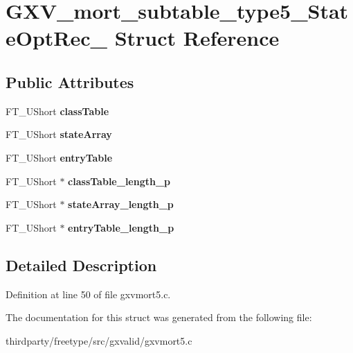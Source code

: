 \hypertarget{struct_g_x_v__mort__subtable__type5___state_opt_rec__}{}\section{G\+X\+V\+\_\+mort\+\_\+subtable\+\_\+type5\+\_\+\+State\+Opt\+Rec\+\_\+ Struct Reference}
\label{struct_g_x_v__mort__subtable__type5___state_opt_rec__}
\subsection*{Public Attributes}
\begin{DoxyCompactItemize}
\item 
\mbox{\label{struct_g_x_v__mort__subtable__type5___state_opt_rec___a9b5124ad7742d751b9063583eb8cda3d}} 
F\+T\+\_\+\+U\+Short {\bfseries class\+Table}
\item 
\mbox{\label{struct_g_x_v__mort__subtable__type5___state_opt_rec___a6799d05fa17deb25e779fc1c28029179}} 
F\+T\+\_\+\+U\+Short {\bfseries state\+Array}
\item 
\mbox{\label{struct_g_x_v__mort__subtable__type5___state_opt_rec___afee07205ffee1017850e002cdb7b1fdc}} 
F\+T\+\_\+\+U\+Short {\bfseries entry\+Table}
\item 
\mbox{\label{struct_g_x_v__mort__subtable__type5___state_opt_rec___a4cdd4222ba3452bf6c38cd85928aa842}} 
F\+T\+\_\+\+U\+Short $\ast$ {\bfseries class\+Table\+\_\+length\+\_\+p}
\item 
\mbox{\label{struct_g_x_v__mort__subtable__type5___state_opt_rec___a10b9d39c266899e292ac19028f635e4f}} 
F\+T\+\_\+\+U\+Short $\ast$ {\bfseries state\+Array\+\_\+length\+\_\+p}
\item 
\mbox{\label{struct_g_x_v__mort__subtable__type5___state_opt_rec___a06cedaf9a66589e0c8fd709c9e6249b4}} 
F\+T\+\_\+\+U\+Short $\ast$ {\bfseries entry\+Table\+\_\+length\+\_\+p}
\end{DoxyCompactItemize}


\subsection{Detailed Description}


Definition at line 50 of file gxvmort5.\+c.



The documentation for this struct was generated from the following file\+:\begin{DoxyCompactItemize}
\item 
thirdparty/freetype/src/gxvalid/gxvmort5.\+c\end{DoxyCompactItemize}
